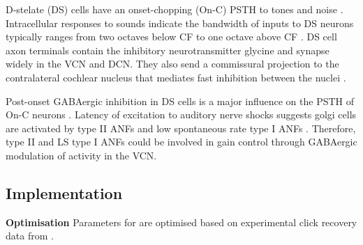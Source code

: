   
D-stelate (DS) cells have an onset-chopping (On-C) PSTH to tones and noise
\citep{SmithRhode:1989,NeedhamPaolini:2006}. Intracellular responses to sounds
indicate the bandwidth of inputs to DS neurons typically ranges from two
octaves below CF to one octave above CF
\citep{PalmerJiangEtAl:1996,PaoliniClark:1999}. DS cell axon terminals contain
the inhibitory neurotransmitter glycine and synapse widely in the VCN and DCN.
They also send a commissural projection to the contralateral cochlear nucleus
that mediates fast inhibition between the nuclei
\citep{NeedhamPaolini:2003,NeedhamPaolini:2006}.  \citep{Oertel:1997}

Post-onset GABAergic inhibition in DS cells is a major influence on the PSTH
of On-C neurons \citep{FerragamoGoldingEtAl:1998a,EvansZhao:1998}. Latency of
excitation to auditory nerve shocks suggests golgi cells are activated by type
II ANFs and low spontaneous rate type I ANFs
\citep{BensonBerglundEtAl:1996,FerragamoGoldingEtAl:1998}. Therefore, type II
and LS type I ANFs could be involved in gain control through GABAergic
modulation of activity in the VCN.



\citep{BackoffPalombiEtAl:1997}

\subsection{Implementation}

\textbf{Optimisation}    
 Parameters for \GLGDS are optimised based on experimental click recovery data from \citep{BackoffPalombiEtAl:1997}.

